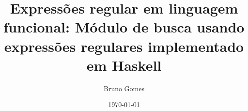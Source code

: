 \documentclass[12pt]{article}
\begin{document}
\title{Expressões regular em linguagem funcional: Módulo de busca usando expressões regulares implementado em Haskell}
\author{Bruno Gomes}
\date{\today}
\maketitle






\printbibliography
\end{document}
